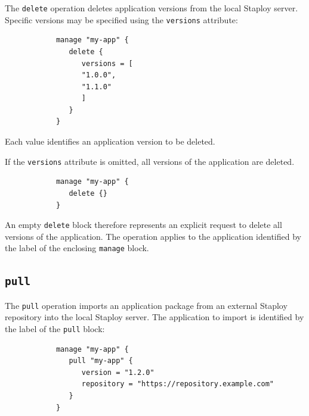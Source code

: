\documentclass[11pt,a4paper]{article}
\begin{document}
    The \texttt{delete} operation deletes application versions from the local Staploy server.
    Specific versions may be specified using the \texttt{versions} attribute:

    \begin{center}
        \begin{verbatim}
            manage "my-app" {
               delete {
                  versions = [
                  "1.0.0",
                  "1.1.0"
                  ]
               }
            }
        \end{verbatim}
    \end{center}

    Each value identifies an application version to be deleted.

    If the \texttt{versions} attribute is omitted, all versions of the application are deleted.

    \begin{center}
        \begin{verbatim}
            manage "my-app" {
               delete {}
            }
        \end{verbatim}
    \end{center}

    An empty \texttt{delete} block therefore represents an explicit request to delete all versions of the application.
    The operation applies to the application identified by the label of the enclosing \texttt{manage} block.

    \subsection{\texttt{pull}}\label{subsec:texttt:pull}

    The \texttt{pull} operation imports an application package from an external Staploy repository into the local Staploy server.
    The application to import is identified by the label of the \texttt{pull} block:

    \begin{center}
        \begin{verbatim}
            manage "my-app" {
               pull "my-app" {
                  version = "1.2.0"
                  repository = "https://repository.example.com"
               }
            }
        \end{verbatim}
    \end{center}
\end{document}
